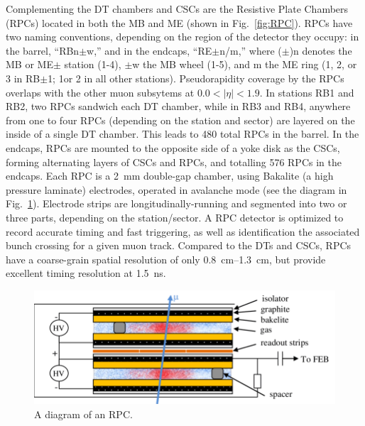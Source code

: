 
Complementing the DT chambers and CSCs are the Resistive Plate Chambers (RPCs) located in both the MB and ME (shown in Fig.~\ref{fig:RPC}). RPCs have two naming conventions, depending on the region of the detector they occupy: in the barrel, ``RBn$\pm$w,'' and in the endcaps, ``RE$\pm$n/m,'' where ($\pm$)n denotes the MB or ME$\pm$ station (1-4), $\pm$w the MB wheel (1-5), and m the ME ring (1, 2, or 3 in RB$\pm$1; 1or 2 in all other stations). Pseudorapidity coverage by the RPCs overlaps with the other muon subsytems at $0.0 < |\eta| < 1.9$. In stations RB1 and RB2, two RPCs sandwich each DT chamber, while in RB3 and RB4, anywhere from one to four RPCs (depending on the station and sector) are layered on the inside of a single DT chamber. This leads to 480 total RPCs in the barrel. In the endcaps, RPCs are mounted to the opposite side of a yoke disk as the CSCs, forming alternating layers of CSCs and RPCs, and totalling 576 RPCs in the endcaps. Each RPC is a \SI{2}{mm} double-gap chamber, using Bakalite (a high pressure laminate) electrodes, operated in avalanche mode (see the diagram in Fig.~\ref{fig:RPCDiagram}). Electrode strips are longitudinally-running and segmented into two or three parts, depending on the station/sector. A RPC detector is optimized to record accurate timing and fast triggering, as well as identification the associated bunch crossing for a given muon track. Compared to the DTs and CSCs, RPCs have a coarse-grain spatial resolution of only \SIrange{0.8}{1.3}{cm}, but provide excellent timing resolution at \SI{1.5}{ns}.

\begin{figure}[H]
    \centering
    \includegraphics[width=\textwidth]{Images/CMS/RPCDiagram.png}
    \caption{A diagram of an RPC.}
    \label{fig:RPCDiagram}
\end{figure}


